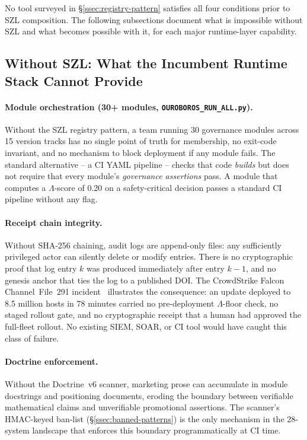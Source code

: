 No tool surveyed in \S\ref{ssec:registry-pattern} satisfies all four
conditions prior to SZL composition.  The following subsections document
what is impossible without SZL and what becomes possible with it, for each
major runtime-layer capability.

\subsection{Without SZL: What the Incumbent Runtime Stack Cannot Provide}
\label{ssec:without-szl-runtime}

\paragraph{Module orchestration (30+ modules, \texttt{OUROBOROS\_RUN\_ALL.py}).}
Without the SZL registry pattern, a team running 30 governance modules across
15 version tracks has no single point of truth for membership, no exit-code
invariant, and no mechanism to block deployment if any module fails.  The
standard alternative -- a CI YAML pipeline -- checks that code \emph{builds}
but does not require that every module's \emph{governance assertions} pass.
A module that computes a $\Lambda$-score of 0.20 on a safety-critical decision
passes a standard CI pipeline without any flag.

\paragraph{Receipt chain integrity.}
Without SHA-256 chaining, audit logs are append-only files: any sufficiently
privileged actor can silently delete or modify entries.  There is no
cryptographic proof that log entry $k$ was produced immediately after entry
$k-1$, and no genesis anchor that ties the log to a published DOI.  The
CrowdStrike Falcon Channel~File~291 incident~\cite{crowdstrike_rca_2024}
illustrates the consequence: an update deployed to 8.5 million hosts in
78 minutes carried no pre-deployment $\Lambda$-floor check, no staged
rollout gate, and no cryptographic receipt that a human had approved the
full-fleet rollout.  No existing SIEM, SOAR, or CI tool would have caught
this class of failure.

\paragraph{Doctrine enforcement.}
Without the Doctrine~v6 scanner, marketing prose can accumulate in module
docstrings and positioning documents, eroding the boundary between
verifiable mathematical claims and unverifiable promotional assertions.
The scanner's HMAC-keyed ban-list (\S\ref{ssec:banned-patterns}) is the
only mechanism in the 28-system landscape that enforces this boundary
programmatically at CI time.

